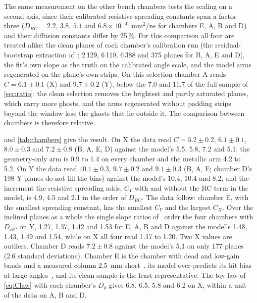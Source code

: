 The same measurement on the other bench chambers tests the scaling on a second axis, since their calibrated resistive
spreading constants span a factor three ($D_{RC} = 2.2$, $3.8$, $5.1$ and $6.8\times10^{-4}$~mm$^2$/ns for chambers E, A, B and D)
and their diffusion constants differ by 25\,\%. For this comparison all four are treated alike: the clean planes of each
chamber's calibration run (the residual-bootstrap extraction of~\cite{paperII}; 2\,129, 6\,119, 6\,388 and 375 planes for B,
A, E and D), the fit's own slope as the truth on the calibrated angle scale, and the model arms regenerated on the plane's own
strips. On this selection chamber A reads $C = 6.1 \pm 0.1$ (X) and $9.7 \pm 0.2$ (Y), below the $7.0$ and $11.7$ of the full
sample of \cref{sec:ratio}: the clean selection removes the brightest and partly saturated planes, which carry more ghosts,
and the arms regenerated without padding strips beyond the window lose the ghosts that lie outside it. The comparison between
chambers is therefore relative.

 and \cref{tab:chambers} give the result. On X the data read $C = 5.2 \pm 0.2$, $6.1 \pm 0.1$, $8.0 \pm 0.3$
and $7.2 \pm 0.8$ (B, A, E, D) against the model's 5.5, 5.8, 7.2 and 5.1; the geometry-only arm is 0.9 to 1.4 on every chamber
and the metallic arm 4.2 to 5.2. On Y the data read $10.1 \pm 0.3$, $9.7 \pm 0.2$ and $9.1 \pm 0.3$ (B, A, E; chamber D's 198
Y planes do not fill the bins) against the model's 10.4, 10.4 and 8.2, and the increment the resistive spreading adds, $C_Y$
with and without the RC term in the model, is 4.9, 4.5 and 2.1 in the order of $D_{RC}$. The data follow: chamber E, with the
smallest spreading constant, has the smallest $C_Y$ and the largest $C_X$. Over the inclined planes as a whole the single
slope ratios of~\cite{paperII} order the four chambers with $D_{RC}$ on Y, 1.27, 1.37, 1.42 and 1.53 for E, A, B and D against
the model's 1.48, 1.43, 1.49 and 1.54, while on X all four read 1.17 to 1.20. Two X values are outliers. Chamber D reads $7.2 \pm 0.8$ against the model's 5.1 on only 177 planes (2.6 standard
deviations). Chamber E is the
chamber with dead and low-gain bands and a measured column 2.5~mm short~\cite{paperI}, its model over-predicts its hit bias at
large angles~\cite{paperII}, and its clean sample is the least representative. The toy law of \cref{eq:Claw} with each
chamber's $D_p$ gives 6.8, 6.5, 5.8 and 6.2 on X, within a unit of the data on A, B and D.

